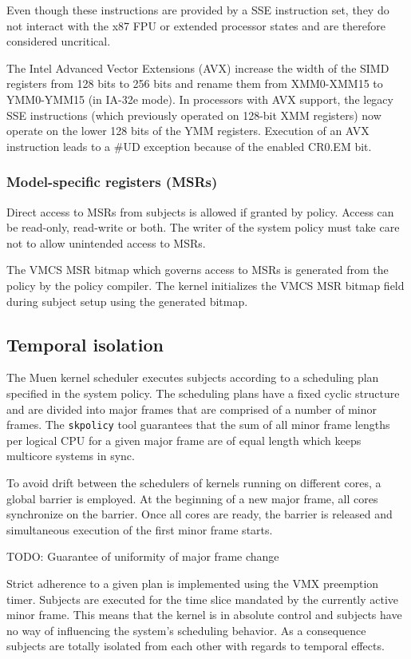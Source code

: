 Even though these instructions are provided by a SSE instruction set, they do
not interact with the x87 FPU or extended processor states and are therefore
considered uncritical.

The Intel Advanced Vector Extensions (AVX) increase the width of the
SIMD registers from 128 bits to 256 bits and rename them from XMM0-XMM15 to
YMM0-YMM15 (in IA-32e mode). In processors with AVX support, the legacy SSE
instructions (which previously operated on 128-bit XMM registers) now operate on
the lower 128 bits of the YMM registers. Execution of an AVX instruction leads
to a \#UD exception because of the enabled CR0.EM bit.

\subsubsection{Model-specific registers (MSRs)}
Direct access to MSRs from subjects is allowed if granted by policy. Access can
be read-only, read-write or both. The writer of the system policy must take care
not to allow unintended access to MSRs.

The VMCS MSR bitmap which governs access to MSRs is generated from the policy by
the policy compiler. The kernel initializes the VMCS MSR bitmap field during
subject setup using the generated bitmap.

\subsection{Temporal isolation}
The Muen kernel scheduler executes subjects according to a scheduling plan
specified in the system policy. The scheduling plans have a fixed cyclic
structure and are divided into major frames that are comprised of a number of
minor frames. The \texttt{skpolicy} tool guarantees that the sum of all minor
frame lengths per logical CPU for a given major frame are of equal length which
keeps multicore systems in sync.

To avoid drift between the schedulers of kernels running on different cores, a
global barrier is employed. At the beginning of a new major frame, all cores
synchronize on the barrier. Once all cores are ready, the barrier is released
and simultaneous execution of the first minor frame starts.

TODO: Guarantee of uniformity of major frame change

Strict adherence to a given plan is implemented using the VMX preemption timer.
Subjects are executed for the time slice mandated by the currently active minor
frame. This means that the kernel is in absolute control and subjects have no
way of influencing the system's scheduling behavior. As a consequence subjects
are totally isolated from each other with regards to temporal effects.

